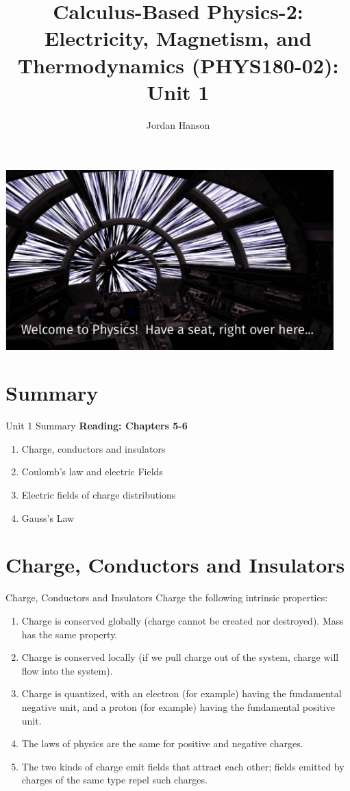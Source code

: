 \documentclass{beamer}
\title{Calculus-Based Physics-2: Electricity, Magnetism, and Thermodynamics (PHYS180-02): Unit 1}
\author{Jordan Hanson}
\institute{Whittier College Department of Physics and Astronomy}
\begin{document}
\maketitle

\begin{frame}
\centering
\includegraphics[width=0.95\textwidth]{figures/hyper.pdf}
\end{frame}

\section{Summary}

\begin{frame}{Unit 1 Summary}
\textbf{Reading: Chapters 5-6}
\begin{enumerate}
\item Charge, conductors and insulators
\item Coulomb's law and electric Fields
\item Electric fields of charge distributions
\item Gauss's Law
\end{enumerate}
\end{frame}

\section{Charge, Conductors and Insulators}

\begin{frame}{Charge, Conductors and Insulators}
\small
Charge the following intrinsic properties: \\ \vspace{0.25cm}
\begin{enumerate}
\item Charge is conserved globally (charge cannot be created nor destroyed).  Mass has the same property.
\item Charge is conserved locally (if we pull charge out of the system, charge will flow into the system).
\item Charge is quantized, with an electron (for example) having the fundamental negative unit, and a proton (for example) having the fundamental positive unit.
\item The laws of physics are the same for positive and negative charges.
\item The two kinds of charge emit fields that attract each other; fields emitted by charges of the same type repel such charges.
\end{enumerate}
\end{frame}
\end{document}
